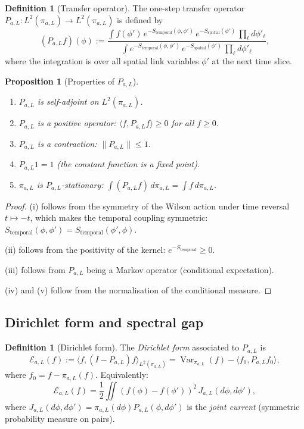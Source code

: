 \documentclass[12pt]{article}
\theoremstyle{plain}
\newtheorem{proposition}[theorem]{Proposition}
\theoremstyle{definition}
\newtheorem{definition}[theorem]{Definition}
\numberwithin{equation}{section}
\newcommand{\Var}{\operatorname{Var}}
\begin{document}
\begin{definition}[Transfer operator]
The one-step transfer operator $P_{a,L}:L^2(\pi_{a,L})\to L^2(\pi_{a,L})$ is defined by
\begin{equation}
(P_{a,L}f)(\phi) := \frac{\int f(\phi')\,e^{-S_{\mathrm{temporal}}(\phi,\phi')}\,e^{-S_{\mathrm{spatial}}(\phi')}\,\prod_\ell d\phi'_\ell}{\int e^{-S_{\mathrm{temporal}}(\phi,\phi')}\,e^{-S_{\mathrm{spatial}}(\phi')}\,\prod_\ell d\phi'_\ell},
\end{equation}
where the integration is over all spatial link variables $\phi'$ at the next time slice.
\end{definition}

\begin{proposition}[Properties of $P_{a,L}$]\label{prop:transferprops}
\begin{enumerate}[label=(\roman*)]
\item $P_{a,L}$ is self-adjoint on $L^2(\pi_{a,L})$.
\item $P_{a,L}$ is a positive operator: $\langle f,P_{a,L}f\rangle\geq 0$ for all $f\geq 0$.
\item $P_{a,L}$ is a contraction: $\|P_{a,L}\|\leq 1$.
\item $P_{a,L}1=1$ (the constant function is a fixed point).
\item $\pi_{a,L}$ is $P_{a,L}$-stationary: $\int(P_{a,L}f)\,d\pi_{a,L}=\int f\,d\pi_{a,L}$.
\end{enumerate}
\end{proposition}

\begin{proof}
(i) follows from the symmetry of the Wilson action under time reversal $t\mapsto-t$, which makes the temporal coupling symmetric: $S_{\mathrm{temporal}}(\phi,\phi')=S_{\mathrm{temporal}}(\phi',\phi)$.

(ii) follows from the positivity of the kernel: $e^{-S_{\mathrm{temporal}}}\geq 0$.

(iii) follows from $P_{a,L}$ being a Markov operator (conditional expectation).

(iv) and (v) follow from the normalisation of the conditional measure.
\end{proof}

\subsection{Dirichlet form and spectral gap}

\begin{definition}[Dirichlet form]
The \emph{Dirichlet form} associated to $P_{a,L}$ is
\begin{equation}
\mathcal{E}_{a,L}(f) := \langle f,(I-P_{a,L})f\rangle_{L^2(\pi_{a,L})} = \Var_{\pi_{a,L}}(f) - \langle f_0,P_{a,L}f_0\rangle,
\end{equation}
where $f_0=f-\pi_{a,L}(f)$.  Equivalently:
\begin{equation}
\mathcal{E}_{a,L}(f) = \frac{1}{2}\iint(f(\phi)-f(\phi'))^2\,J_{a,L}(d\phi,d\phi'),
\end{equation}
where $J_{a,L}(d\phi,d\phi')=\pi_{a,L}(d\phi)P_{a,L}(\phi,d\phi')$ is the \emph{joint current} (symmetric probability measure on pairs).
\end{definition}
\end{document}
